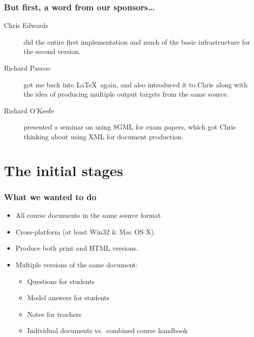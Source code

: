 \documentclass[pdftex,notes=onlyslideswithnotes]{beamer}
\begin{document}
\frame
{
	\frametitle{But first, a word from our sponsors\ldots}
	
	\begin{description}
	
		\item[Chris Edwards] did the entire first implementation and
		much of the basic infrastructure for the second version.
	
		\item[Richard Pascoe] got me back into \LaTeX\ again, and also
		introduced it to Chris along with the idea of producing multiple
		output targets from the same source.
		
		\item[Richard O'Keefe] presented a seminar on using SGML for
		exam papers, which got Chris thinking about using XML for
		document production.
	
	\end{description}
}


\section[History]{The initial stages}


\frame
{
	\frametitle{What we wanted to do}
	
	\begin{itemize}
	
		\item All course documents in the same source format.
		
		\item Cross-platform (at least Win32 \& Mac OS X).
		
		
		\item Produce both print and HTML versions.
		
		\item Multiple versions of the same document:
		
		\begin{itemize}
		
			\item Questions for students
			
			\item Model answers for students
			
			\item Notes for teachers
			
			\item Individual documents vs.\ combined course handbook
		
		\end{itemize}
	
	\end{itemize}
}
\end{document}
